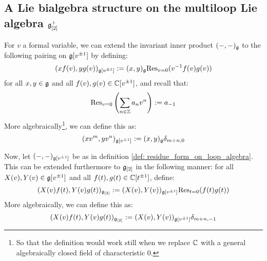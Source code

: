         \subsection{A Lie bialgebra structure on the multiloop Lie algebra \texorpdfstring{$\mathfrak{g}_{[2]}^+$}{}}
            \begin{definition} \label{def: residue_form_on_loop_algebra}
                For $v$ a formal variable, we can extend the invariant inner product $(-, -)_{\mathfrak{g}}$ to the following pairing on $\mathfrak{g}[v^{\pm 1}]$ by defining:
                    $$(x f(v), y g(v))_{\mathfrak{g}[v^{\pm 1}]} := (x, y)_{\mathfrak{g}} \mathrm{Res}_{v = 0}( v^{-1} f(v) g(v) )$$
                for all $x, y \in \mathfrak{g}$ and all $f(v), g(v) \in \mathbb{C}[v^{\pm 1}]$, and recall that:
                    $$\mathrm{Res}_{v = 0}\left( \sum_{n \in \mathbb{Z}} a_n v^n \right) := a_{-1}$$
                More algebraically\footnote{So that the definition would work still when we replace $\mathbb{C}$ with a general algebraically closed field of characteristic $0$.}, we can define this as:
                    $$(x v^m, y v^n)_{\mathfrak{g}[v^{\pm 1}]} := (x, y)_{\mathfrak{g}} \delta_{m + n, 0}$$
            \end{definition}
            \begin{definition} \label{def: residue_form_on_multi_loop_algebra}
                Now, let $(-, -)_{\mathfrak{g}[v^{\pm 1}]}$ be as in definition \ref{def: residue_form_on_loop_algebra}. This can be extended furthermore to $\mathfrak{g}_{[2]}$ in the following manner: for all $X(v), Y(v) \in \mathfrak{g}[v^{\pm 1}]$ and all $f(t), g(t) \in \mathbb{C}[t^{\pm 1}]$, define:
                    $$(X(v) f(t), Y(v) g(t))_{\mathfrak{g}_{[2]}} := (X(v), Y(v))_{\mathfrak{g}[v^{\pm 1}]} \mathrm{Res}_{t = 0}( f(t) g(t) )$$
                More algebraically, we can define this as:
                    $$(X(v) f(t), Y(v) g(t))_{\mathfrak{g}_{[2]}} := (X(v), Y(v))_{\mathfrak{g}[v^{\pm 1}]} \delta_{m + n, -1}$$
            \end{definition}

